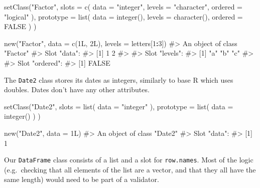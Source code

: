 \documentclass[
]{krantz}
\makeatletter
\newenvironment{Shaded}{\begin{snugshade}}{\end{snugshade}}
\newcommand{\CommentTok}[1]{\textcolor[rgb]{0.56,0.35,0.01}{\textit{#1}}}
\newcommand{\DataTypeTok}[1]{\textcolor[rgb]{0.13,0.29,0.53}{#1}}
\newcommand{\DecValTok}[1]{\textcolor[rgb]{0.00,0.00,0.81}{#1}}
\newcommand{\KeywordTok}[1]{\textcolor[rgb]{0.13,0.29,0.53}{\textbf{#1}}}
\newcommand{\NormalTok}[1]{#1}
\newcommand{\OperatorTok}[1]{\textcolor[rgb]{0.81,0.36,0.00}{\textbf{#1}}}
\newcommand{\OtherTok}[1]{\textcolor[rgb]{0.56,0.35,0.01}{#1}}
\newcommand{\StringTok}[1]{\textcolor[rgb]{0.31,0.60,0.02}{#1}}
\newenvironment{kframe}{%
\medskip{}
\setlength{\fboxsep}{.8em}
 \def\at@end@of@kframe{}%
 \ifinner\ifhmode%
  \def\at@end@of@kframe{\end{minipage}}%
  \begin{minipage}{\columnwidth}%
 \fi\fi%
 \def\FrameCommand##1{\hskip\@totalleftmargin \hskip-\fboxsep
 \colorbox{shadecolor}{##1}\hskip-\fboxsep
     \hskip-\linewidth \hskip-\@totalleftmargin \hskip\columnwidth}%
 \MakeFramed {\advance\hsize-\width
   \@totalleftmargin\z@ \linewidth\hsize
   \@setminipage}}%
 {\par\unskip\endMakeFramed%
 \at@end@of@kframe}
\renewenvironment{Shaded}{\begin{kframe}}{\end{kframe}}
\renewcommand{\KeywordTok} [1]{\textcolor[rgb]{0.00,0.44,0.13}{{#1}}}
\renewcommand{\DataTypeTok}[1]{\textcolor[rgb]{0.56,0.13,0.00}{{#1}}}
\renewcommand{\DecValTok}  [1]{\textcolor[rgb]{0.25,0.63,0.44}{{#1}}}
\renewcommand{\StringTok}  [1]{\textcolor[rgb]{0.25,0.44,0.63}{{#1}}}
\renewcommand{\CommentTok} [1]{\textcolor[rgb]{0.38,0.63,0.69}{{#1}}}
\renewcommand{\OtherTok}   [1]{\textcolor[rgb]{0.00,0.44,0.13}{{#1}}}
\renewcommand{\NormalTok}  [1]{{#1}}
\makeatother
\begin{document}
\begin{Shaded}
\begin{Highlighting}[]
\KeywordTok{setClass}\NormalTok{(}\StringTok{"Factor"}\NormalTok{, }
         \DataTypeTok{slots =} \KeywordTok{c}\NormalTok{(}
           \DataTypeTok{data =} \StringTok{"integer"}\NormalTok{,}
           \DataTypeTok{levels =} \StringTok{"character"}\NormalTok{,}
           \DataTypeTok{ordered =} \StringTok{"logical"}
\NormalTok{         ),}
         \DataTypeTok{prototype =} \KeywordTok{list}\NormalTok{(}
           \DataTypeTok{data =} \KeywordTok{integer}\NormalTok{(),}
           \DataTypeTok{levels =} \KeywordTok{character}\NormalTok{(),}
           \DataTypeTok{ordered =} \OtherTok{FALSE}
\NormalTok{         )}
\NormalTok{)}


\KeywordTok{new}\NormalTok{(}\StringTok{"Factor"}\NormalTok{, }\DataTypeTok{data =} \KeywordTok{c}\NormalTok{(1L, 2L), }\DataTypeTok{levels =}\NormalTok{ letters[}\DecValTok{1}\OperatorTok{:}\DecValTok{3}\NormalTok{])}
\CommentTok{#> An object of class "Factor"}
\CommentTok{#> Slot "data":}
\CommentTok{#> [1] 1 2}
\CommentTok{#> }
\CommentTok{#> Slot "levels":}
\CommentTok{#> [1] "a" "b" "c"}
\CommentTok{#> }
\CommentTok{#> Slot "ordered":}
\CommentTok{#> [1] FALSE}
\end{Highlighting}
\end{Shaded}

The \texttt{Date2} class stores its dates as integers, similarly to base R which uses doubles. Dates don't have any other attributes.

\begin{Shaded}
\begin{Highlighting}[]
\KeywordTok{setClass}\NormalTok{(}\StringTok{"Date2"}\NormalTok{,}
         \DataTypeTok{slots =} \KeywordTok{list}\NormalTok{(}
           \DataTypeTok{data =} \StringTok{"integer"}
\NormalTok{         ),}
         \DataTypeTok{prototype =} \KeywordTok{list}\NormalTok{(}
           \DataTypeTok{data =} \KeywordTok{integer}\NormalTok{()}
\NormalTok{         )}
\NormalTok{)}

\KeywordTok{new}\NormalTok{(}\StringTok{"Date2"}\NormalTok{, }\DataTypeTok{data =}\NormalTok{ 1L)}
\CommentTok{#> An object of class "Date2"}
\CommentTok{#> Slot "data":}
\CommentTok{#> [1] 1}
\end{Highlighting}
\end{Shaded}

Our \texttt{DataFrame} class consists of a list and a slot for \texttt{row.names}. Most of the logic (e.g.~checking that all elements of the list are a vector, and that they all have the same length) would need to be part of a validator.
\end{document}
